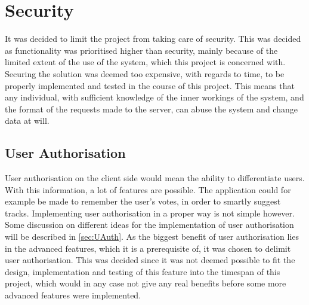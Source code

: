 \section{Security}
It was decided to limit the project from taking care of security. This was decided as functionality was prioritised higher than security, mainly because of the limited extent of the use of the system, which this project is concerned with. Securing the solution was deemed too expensive, with regards to time, to be properly implemented and tested in the course of this project.
This means that any individual, with sufficient knowledge of the inner workings of the system, and the format of the requests made to the server, can abuse the system and change data at will.

\subsection{User Authorisation}
\label{par:user_authorization}
User authorisation on the client side would mean the ability to differentiate users. With this information, a lot of features are possible. The application could for example be made to remember the user's votes, in order to smartly suggest tracks.
Implementing user authorisation in a proper way is not simple however. Some discussion on different ideas for the implementation of user authorisation will be described in \cref{sec:UAuth}.
As the biggest benefit of user authorisation lies in the advanced features, which it is a prerequisite of, it was chosen to delimit user authorisation. This was decided since it was not deemed possible to fit the design, implementation and testing of this feature into the timespan of this project, which would in any case not give any real benefits before some more advanced features were implemented.